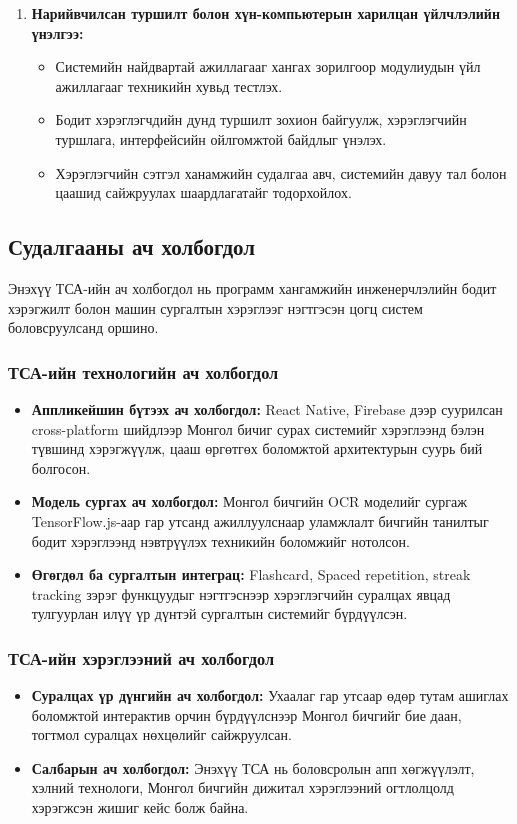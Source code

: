 \begin{enumerate}
    \item \textbf{Нарийвчилсан туршилт болон хүн-компьютерын харилцан үйлчлэлийн үнэлгээ:}
    \begin{itemize}
        \item Системийн найдвартай ажиллагааг хангах зорилгоор модулиудын үйл ажиллагааг техникийн хувьд тестлэх.
        \item Бодит хэрэглэгчдийн дунд туршилт зохион байгуулж, хэрэглэгчийн туршлага, интерфейсийн ойлгомжтой байдлыг үнэлэх.
        \item Хэрэглэгчийн сэтгэл ханамжийн судалгаа авч, системийн давуу тал болон цаашид сайжруулах шаардлагатайг тодорхойлох.
    \end{itemize}
\end{enumerate}

\subsection{Судалгааны ач холбогдол}
\label{subsec:significance}

Энэхүү ТСА-ийн ач холбогдол нь программ хангамжийн инженерчлэлийн бодит хэрэгжилт болон машин сургалтын хэрэглээг нэгтгэсэн цогц систем боловсруулсанд оршино.

\subsubsection{ТСА-ийн технологийн ач холбогдол}
\begin{itemize}
    \item \textbf{Аппликейшин бүтээх ач холбогдол:} React Native, Firebase дээр суурилсан cross-platform шийдлээр Монгол бичиг сурах системийг хэрэглээнд бэлэн түвшинд хэрэгжүүлж, цааш өргөтгөх боломжтой архитектурын суурь бий болгосон.
    \item \textbf{Модель сургах ач холбогдол:} Монгол бичгийн OCR моделийг сургаж TensorFlow.js-аар гар утсанд ажиллуулснаар уламжлалт бичгийн танилтыг бодит хэрэглээнд нэвтрүүлэх техникийн боломжийг нотолсон.
    \item \textbf{Өгөгдөл ба сургалтын интеграц:} Flashcard, Spaced repetition, streak tracking зэрэг функцуудыг нэгтгэснээр хэрэглэгчийн суралцах явцад тулгуурлан илүү үр дүнтэй сургалтын системийг бүрдүүлсэн.
\end{itemize}

\subsubsection{ТСА-ийн хэрэглээний ач холбогдол}
\begin{itemize}
    \item \textbf{Суралцах үр дүнгийн ач холбогдол:} Ухаалаг гар утсаар өдөр тутам ашиглах боломжтой интерактив орчин бүрдүүлснээр Монгол бичгийг бие даан, тогтмол суралцах нөхцөлийг сайжруулсан.
    \item \textbf{Салбарын ач холбогдол:} Энэхүү ТСА нь боловсролын апп хөгжүүлэлт, хэлний технологи, Монгол бичгийн дижитал хэрэглээний огтлолцолд хэрэгжсэн жишиг кейс болж байна.
\end{itemize}

